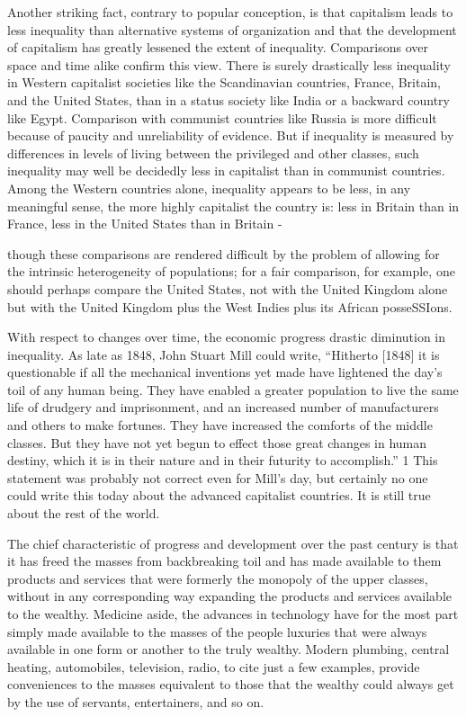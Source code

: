 \documentclass[11pt,openany]{book}
\begin{document}
Another striking fact, contrary to popular conception, is that capitalism leads to less inequality than alternative systems of organization and that the development of capitalism has greatly lessened the extent of inequality. Comparisons over space and time alike confirm this view. There is surely drastically less inequality in Western capitalist societies like the Scandinavian countries, France, Britain, and the United States, than in a status society like India or a backward country like Egypt. Comparison with communist countries like Russia is more difficult because of paucity and unreliability of evidence. But if inequality is measured by differences in levels of living between the privileged and other classes, such inequality may well be decidedly less in capitalist than in communist countries. Among the Western countries alone, inequality appears to be less, in any meaningful sense, the more highly capitalist the country is: less in Britain than in France, less in the United States than in Britain -

though these comparisons are rendered difficult by the problem of allowing for the intrinsic heterogeneity of populations; for a fair comparison, for example, one should perhaps compare the United States, not with the United Kingdom alone but with the United Kingdom plus the West Indies plus its African posseSSIons.

With respect to changes over time, the economic progress drastic diminution in inequality. As late as 1848, John Stuart Mill could write, ``Hitherto [1848] it is questionable if all the mechanical inventions yet made have lightened the day's toil of any human being. They have enabled a greater population to live the same life of drudgery and imprisonment, and an increased number of manufacturers and others to make fortunes. They have increased the comforts of the middle classes. But they have not yet begun to effect those great changes in human destiny, which it is in their nature and in their futurity to accomplish.'' 1 This statement was probably not correct even for Mill's day, but certainly no one could write this today about the advanced capitalist countries. It is still true about the rest of the world.

The chief characteristic of progress and development over the past century is that it has freed the masses from backbreaking toil and has made available to them products and services that were formerly the monopoly of the upper classes, without in any corresponding way expanding the products and services available to the wealthy. Medicine aside, the advances in technology have for the most part simply made available to the masses of the people luxuries that were always available in one form or another to the truly wealthy. Modern plumbing, central heating, automobiles, television, radio, to cite just a few examples, provide conveniences to the masses equivalent to those that the wealthy could always get by the use of servants, entertainers, and so on.
\end{document}
